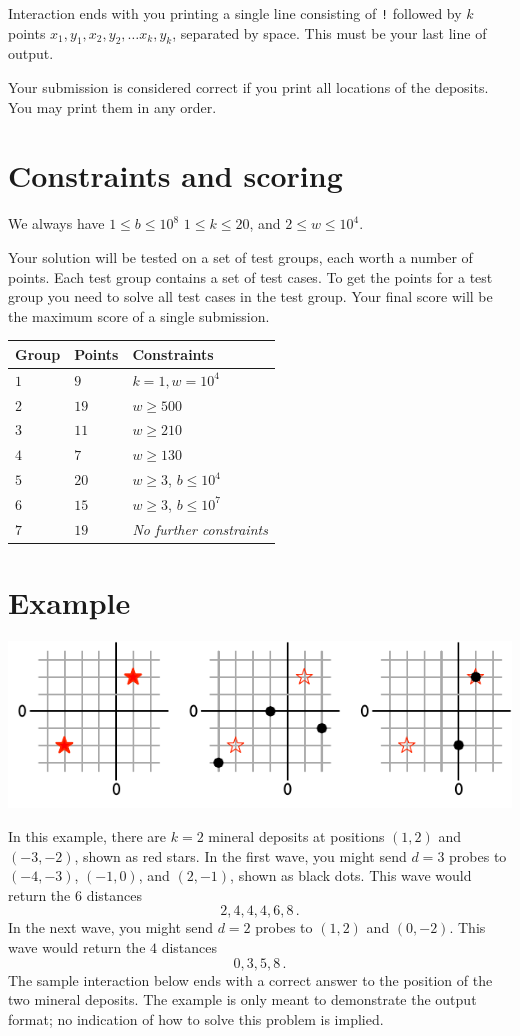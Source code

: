 Interaction ends with you printing a single line consisting of \texttt{!} followed by $k$ points $x_1, y_1, x_2, y_2, \ldots x_k, y_k$, separated by space.
This must be your last line of output.

Your submission is considered correct if you print all locations of the deposits.
You may print them in any order.

\section*{Constraints and scoring}

We always have 
$1\leq b \leq 10^8$ %
$1 \leq k \leq 20$, %
and
$2 \le w \le 10^4$. %

Your solution will be tested on a set of test groups, each worth a number of points.
Each test group contains a set of test cases.
To get the points for a test group you need to solve all test cases in the test group.
Your final score will be the maximum score of a single submission.

\medskip
\begin{tabular}{lll}
Group & Points & Constraints \\\hline
  $1$ & $9$ & $k = 1, w = 10^4$\\
  $2$ & $19$ & $w \ge 500$\\
  $3$ & $11$ & $w \ge 210$\\
  $4$ & $7$ & $w \ge 130$\\
  $5$ & $20$ & $w \ge 3$, $b \le 10^4$\\
  $6$ & $15$ & $w \ge 3$, $b \le 10^7$\\
  $7$ & $19$ & \emph{No further constraints}
\end{tabular}

\section*{Example}

\includegraphics[width=.6\textwidth]{img/sample1.pdf}

In this example, there are $k=2$ mineral deposits at positions $(1,2)$ and $(-3,-2)$, shown as red stars.
In the first wave, you might send $d=3$ probes to $(-4,-3)$, $(-1, 0)$, and $(2,-1)$, shown as black dots.
This wave would return the $6$ distances \[
  2, 4, 4, 4, 6, 8\,.
\]
In the next wave, you might send $d=2$ probes to $(1,2)$ and $(0,-2)$.
This wave would return the $4$ distances \[
  0, 3, 5, 8\,.
\]
The sample interaction below ends with a correct answer to the position of the two mineral deposits.
The example is only meant to demonstrate the output format; no indication of how to solve this problem is implied.
